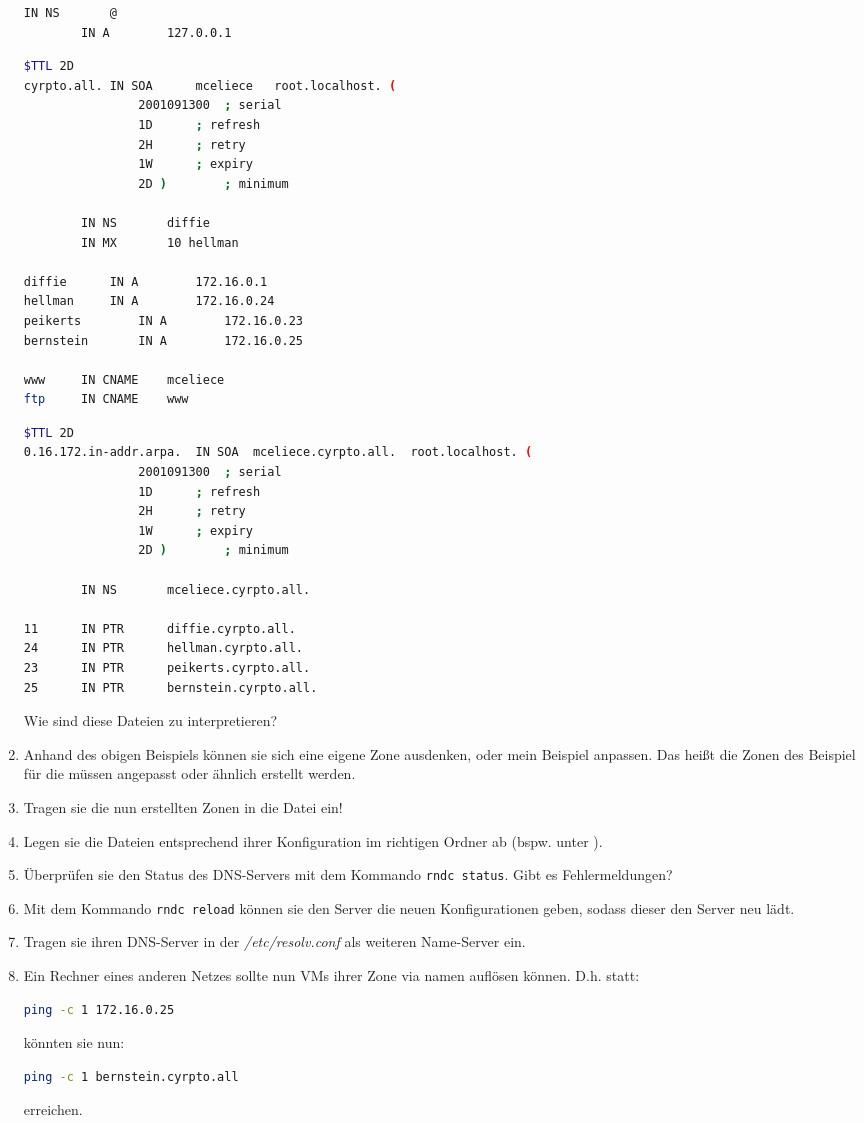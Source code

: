 \documentclass[paper=a4,fontsize=11pt]{scrartcl}%
\numberwithin{equation}{section}
\begin{document}
\begin{enumerate}
\begin{lstlisting}[style=Bash, language=Bash]
		IN NS		@
		IN A		127.0.0.1
\end{lstlisting}

\begin{lstlisting}[style=Bash, language=Bash]
$TTL 2D
cyrpto.all.	IN SOA		mceliece   root.localhost. (
				2001091300	; serial
				1D		; refresh
				2H		; retry
				1W		; expiry
				2D )		; minimum

		IN NS		diffie
		IN MX		10 hellman

diffie		IN A		172.16.0.1
hellman	    IN A		172.16.0.24
peikerts		IN A		172.16.0.23
bernstein		IN A		172.16.0.25

www		IN CNAME	mceliece
ftp		IN CNAME	www
\end{lstlisting}

\begin{lstlisting}[style=Bash, language=Bash]
$TTL 2D
0.16.172.in-addr.arpa.  IN SOA  mceliece.cyrpto.all.  root.localhost. (
				2001091300	; serial
				1D		; refresh
				2H		; retry
				1W		; expiry
				2D )		; minimum

		IN NS		mceliece.cyrpto.all.

11		IN PTR		diffie.cyrpto.all.
24		IN PTR		hellman.cyrpto.all.
23		IN PTR		peikerts.cyrpto.all.
25		IN PTR  	bernstein.cyrpto.all.
\end{lstlisting}
Wie sind diese Dateien zu interpretieren?
	\item Anhand des obigen Beispiels können sie sich eine eigene Zone ausdenken, oder mein Beispiel anpassen. Das heißt die Zonen des Beispiel für die  müssen angepasst oder ähnlich erstellt werden.
	\item Tragen sie die nun erstellten Zonen in die  Datei ein!
	\item Legen sie die Dateien entsprechend ihrer Konfiguration im richtigen Ordner ab (bspw. unter ).
	\item Überprüfen sie den Status des DNS-Servers mit dem Kommando \texttt{rndc status}. Gibt es Fehlermeldungen?
	\item Mit dem Kommando \texttt{rndc reload} können sie den Server die neuen Konfigurationen geben, sodass dieser den Server neu lädt.
		\item Tragen sie ihren DNS-Server in der \emph{/etc/resolv.conf} als weiteren Name-Server ein.
		\item Ein Rechner eines anderen Netzes sollte nun VMs ihrer Zone via namen auflösen können. D.h. statt:
		\begin{lstlisting}[style=Bash, language=Bash]
ping -c 1 172.16.0.25 
		\end{lstlisting}
		könnten sie nun:
		\begin{lstlisting}[style=Bash, language=Bash]
ping -c 1 bernstein.cyrpto.all
		\end{lstlisting}
		erreichen.
\end{enumerate}
\end{document}

